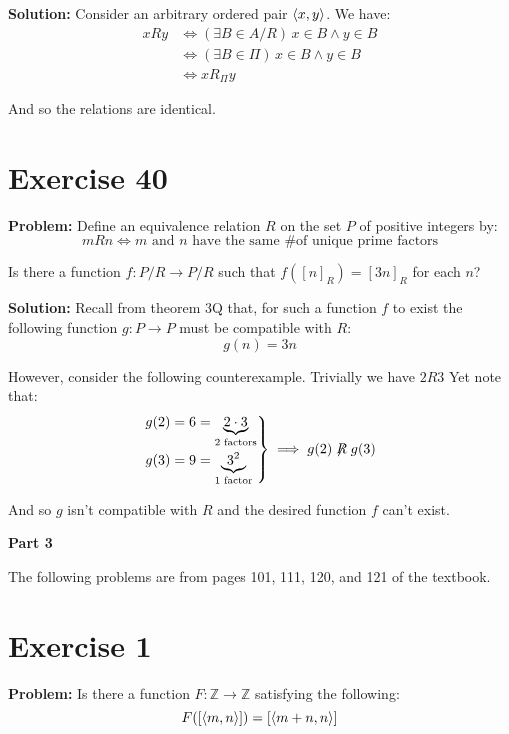 \documentclass{article}
\newenvironment{rcases}
  {\left.\begin{aligned}}
  {\end{aligned}\right\rbrace}
\begin{document}
\noindent\textbf{Solution:} Consider an arbitrary ordered pair $\langle x,y\rangle$. We have:
\begin{align*}
    xRy&\iff(\exists B\in A/R)\, x\in B\wedge y\in B\tag{def. quotient set}\\
    &\iff(\exists B\in \Pi)\, x\in B\wedge y\in B\tag{def. $\Pi$}\\
    &\iff xR_\Pi y\tag{def. of $R_\Pi$}
\end{align*}

And so the relations are identical. 

\section*{Exercise 40}
\noindent\textbf{Problem:} Define an equivalence relation $R$ on the set $P$ of positive integers by:
\begin{equation*}
    mRn \iff \text{$m$ and $n$ have the same \# of unique prime factors}
\end{equation*}

Is there a function $f:P/R\to P/R$ such that $f([n]_R)=[3n]_R$ for each $n$?
\bigskip

\noindent\textbf{Solution:} Recall from theorem 3Q that, for such a function $f$ to exist the following function $g:P\to P$ must be compatible with $R$:
\begin{equation*}
    g(n)=3n
\end{equation*}

However, consider the following counterexample. Trivially we have $2R3$ Yet note that:
\begin{equation*}
    \begin{rcases}
        g(2)&=6=\underbrace{2\cdot3}_{2\text{ factors}}\\
        g(3)&=9=\underbrace{3^2}_{1\text{ factor}}
    \end{rcases}\implies g(2)\centernot{R}g(3)
\end{equation*}

And so $g$ isn't compatible with $R$ and the desired function $f$ can't exist.

\begin{center}
    \Large{\textbf{Part 3}}
\end{center}

The following problems are from pages 101, 111, 120, and 121 of the textbook.

\section*{Exercise 1}
\noindent\textbf{Problem:} Is there a function $F:\mathbb Z\to \mathbb Z$ satisfying the following:
\begin{equation*}
    F([\langle m,n\rangle])=[\langle m+n,n\rangle]
\end{equation*}
\smallskip
\end{document}
